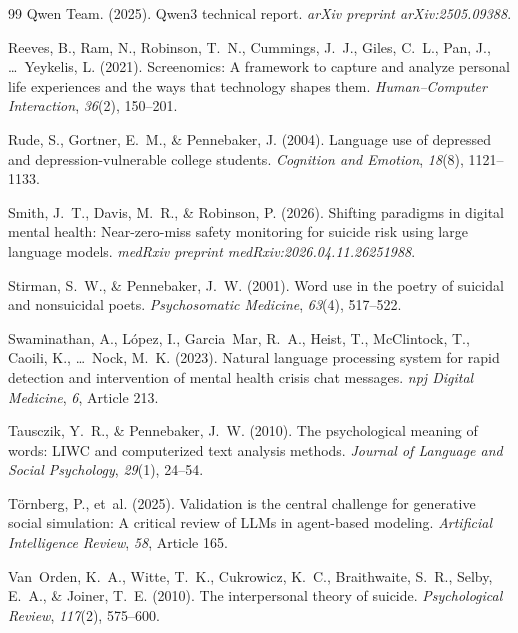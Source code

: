 \documentclass[review,12pt,authoryear]{elsarticle}
\begin{document}
\begin{thebibliography}{99}
Qwen Team. (2025).
\newblock Qwen3 technical report.
\newblock \textit{arXiv preprint arXiv:2505.09388}.

Reeves, B., Ram, N., Robinson, T.~N., Cummings, J.~J., Giles, C.~L., Pan, J., \ldots\ Yeykelis, L. (2021).
\newblock Screenomics: {A} framework to capture and analyze personal life experiences and the ways that technology shapes them.
\newblock \textit{Human--Computer Interaction}, \textit{36}(2), 150--201.

Rude, S., Gortner, E.~M., \& Pennebaker, J. (2004).
\newblock Language use of depressed and depression-vulnerable college students.
\newblock \textit{Cognition and Emotion}, \textit{18}(8), 1121--1133.

Smith, J.~T., Davis, M.~R., \& Robinson, P. (2026).
\newblock Shifting paradigms in digital mental health: Near-zero-miss safety monitoring for suicide risk using large language models.
\newblock \textit{medRxiv preprint medRxiv:2026.04.11.26251988}.

Stirman, S.~W., \& Pennebaker, J.~W. (2001).
\newblock Word use in the poetry of suicidal and nonsuicidal poets.
\newblock \textit{Psychosomatic Medicine}, \textit{63}(4), 517--522.

Swaminathan, A., L{\'o}pez, I., Garcia~Mar, R.~A., Heist, T., McClintock, T., Caoili, K., \ldots\ Nock, M.~K. (2023).
\newblock Natural language processing system for rapid detection and intervention of mental health crisis chat messages.
\newblock \textit{npj Digital Medicine}, \textit{6}, Article 213.

Tausczik, Y.~R., \& Pennebaker, J.~W. (2010).
\newblock The psychological meaning of words: {LIWC} and computerized text analysis methods.
\newblock \textit{Journal of Language and Social Psychology}, \textit{29}(1), 24--54.

T{\"o}rnberg, P., et~al. (2025).
\newblock Validation is the central challenge for generative social simulation: {A} critical review of {LLMs} in agent-based modeling.
\newblock \textit{Artificial Intelligence Review}, \textit{58}, Article 165.

Van~Orden, K.~A., Witte, T.~K., Cukrowicz, K.~C., Braithwaite, S.~R., Selby, E.~A., \& Joiner, T.~E. (2010).
\newblock The interpersonal theory of suicide.
\newblock \textit{Psychological Review}, \textit{117}(2), 575--600.


\end{thebibliography}
\end{document}
